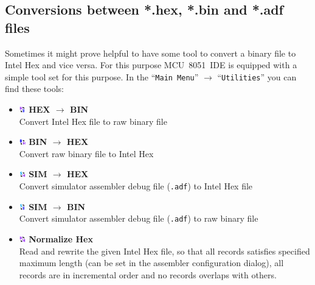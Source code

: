 \documentclass[a4paper,twoside,12pt]{book}
\newcommand{\menuitem}[1]{\texttt{#1}}
\newcommand{\fileextension}[1]{\texttt{#1}}
\begin{document}
		\subsection{Conversions between *.hex, *.bin and *.adf files}
			Sometimes it might prove helpful to have some tool to convert a binary file to Intel Hex and vice versa. For this purpose MCU~8051~IDE is equipped with a simple tool set for this purpose. In the ``\menuitem{Main Menu}'' $\rightarrow$ ``\menuitem{Utilities}'' you can find these tools:
			\begin{itemize}
				\setlength{\itemsep}{-3pt}
				\item \includegraphics[height=8pt]{img/hb.png} \textbf{HEX $\rightarrow$ BIN} \\
					Convert Intel Hex file to raw binary file
				\item \includegraphics[height=8pt]{img/bh.png} \textbf{BIN $\rightarrow$ HEX} \\
					Convert raw binary file to Intel Hex
				\item \includegraphics[height=8pt]{img/sh.png} \textbf{SIM $\rightarrow$ HEX} \\
					Convert simulator assembler debug file (\fileextension{.adf}) to Intel Hex file
				\item \includegraphics[height=8pt]{img/sb.png} \textbf{SIM $\rightarrow$ BIN} \\
					Convert simulator assembler debug file (\fileextension{.adf}) to raw binary file
				\item \includegraphics[height=8pt]{img/hh.png} \textbf{Normalize Hex} \\
					Read and rewrite the given Intel Hex file, so that all records satisfies specified maximum length (can be set in the assembler configuration dialog), all records are in incremental order and no records overlaps with others.
			\end{itemize}
\end{document}
